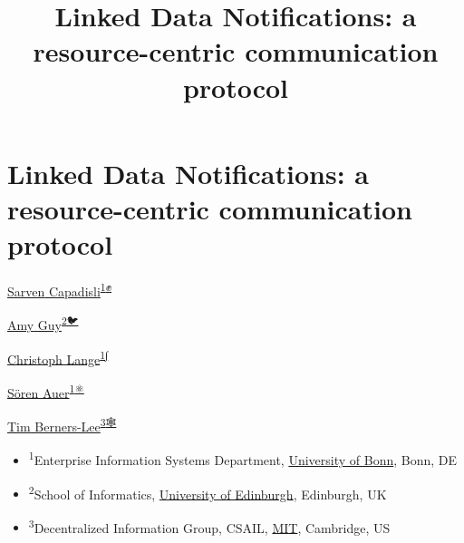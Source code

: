 \documentclass[]{article}
\title{Linked Data Notifications: a resource-centric communication protocol}
\date{}
\providecommand{\tightlist}{%
  \setlength{\itemsep}{0pt}\setlength{\parskip}{0pt}}
\begin{document}
\maketitle

\section{Linked Data Notifications: a resource-centric communication
protocol}\label{linked-data-notifications-a-resource-centric-communication-protocol}

\hypertarget{authors}{}
\begin{description}
\tightlist
\item[Authors]
{{\href{http://csarven.ca/}{{{Sarven}
{Capadisli}}}}}\textsuperscript{\protect\hyperlink{author-org-1}{1}\protect\hyperlink{author-email-1}{✊}}

{{\href{https://rhiaro.co.uk/}{{{Amy}
{Guy}}}}}\textsuperscript{\protect\hyperlink{author-org-2}{2}\protect\hyperlink{author-email-2}{🐦}}

{\href{https://langec.wordpress.com/about/}{Christoph
Lange}}\textsuperscript{\protect\hyperlink{author-org-1}{1}\protect\hyperlink{author-email-3}{∫}}

{\href{http://eis.iai.uni-bonn.de/SoerenAuer.html}{Sören
Auer}}\textsuperscript{\protect\hyperlink{author-org-1}{1}\protect\hyperlink{author-email-4}{⚛}}

{\href{https://www.w3.org/People/Berners-Lee/}{Tim
Berners-Lee}}\textsuperscript{\protect\hyperlink{author-org-4}{3}\protect\hyperlink{author-email-5}{🕸}}
\end{description}

\begin{itemize}
\item
  \hypertarget{author-org-1}{}

  \textsuperscript{1}Enterprise Information Systems Department,
  \href{http://uni-bonn.de/}{University of Bonn}, Bonn, DE
\item
  \hypertarget{author-org-2}{}

  \textsuperscript{2}School of Informatics,
  \href{http://inf.ed.ac.uk/}{University of Edinburgh}, Edinburgh, UK
\item
  \hypertarget{author-org-3}{}

  \textsuperscript{3}Decentralized Information Group, CSAIL,
  \href{https://mit.edu/}{MIT}, Cambridge, US
\end{itemize}
\end{document}
